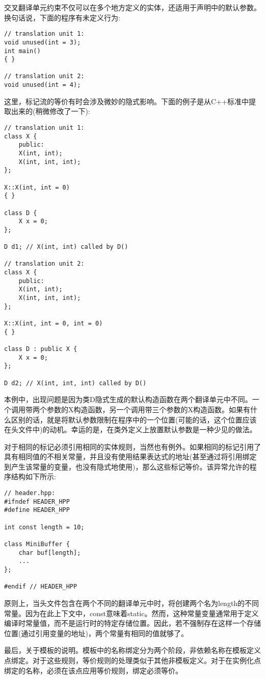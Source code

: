 交叉翻译单元约束不仅可以在多个地方定义的实体，还适用于声明中的默认参数。换句话说，下面的程序有未定义行为:

\begin{lstlisting}[style=styleCXX]
// translation unit 1:
void unused(int = 3);
int main()
{ }

// translation unit 2:
void unused(int = 4);
\end{lstlisting}

这里，标记流的等价有时会涉及微妙的隐式影响。下面的例子是从C++标准中提取出来的(稍微修改了一下):

\begin{lstlisting}[style=styleCXX]
// translation unit 1:
class X {
	public:
	X(int, int);
	X(int, int, int);
};

X::X(int, int = 0)
{ }

class D {
	X x = 0;
};

D d1; // X(int, int) called by D()

// translation unit 2:
class X {
	public:
	X(int, int);
	X(int, int, int);
};

X::X(int, int = 0, int = 0)
{ }

class D : public X {
	X x = 0;
};

D d2; // X(int, int, int) called by D()
\end{lstlisting}

本例中，出现问题是因为类D隐式生成的默认构造函数在两个翻译单元中不同。一个调用带两个参数的X构造函数，另一个调用带三个参数的X构造函数。如果有什么区别的话，就是将默认参数限制在程序中的一个位置(可能的话，这个位置应该在头文件中)的动机。幸运的是，在类外定义上放置默认参数是一种少见的做法。

对于相同的标记必须引用相同的实体规则，当然也有例外。如果相同的标记引用了具有相同值的不相关常量，并且没有使用结果表达式的地址(甚至通过将引用绑定到产生该常量的变量，也没有隐式地使用)，那么这些标记等价。该异常允许的程序结构如下所示:

\begin{lstlisting}[style=styleCXX]
// header.hpp:
#ifndef HEADER_HPP
#define HEADER_HPP

int const length = 10;

class MiniBuffer {
	char buf[length];
	...
};

#endif // HEADER_HPP
\end{lstlisting}

原则上，当头文件包含在两个不同的翻译单元中时，将创建两个名为length的不同常量。因为在此上下文中，const意味着static。然而，这种常量变量通常用于定义编译时常量值，而不是运行时的特定存储位置。因此，若不强制存在这样一个存储位置(通过引用变量的地址)，两个常量有相同的值就够了。

最后，关于模板的说明。模板中的名称绑定分为两个阶段，非依赖名称在模板定义点绑定。对于这些规则，等价规则的处理类似于其他非模板定义。对于在实例化点绑定的名称，必须在该点应用等价规则，绑定必须等价。





